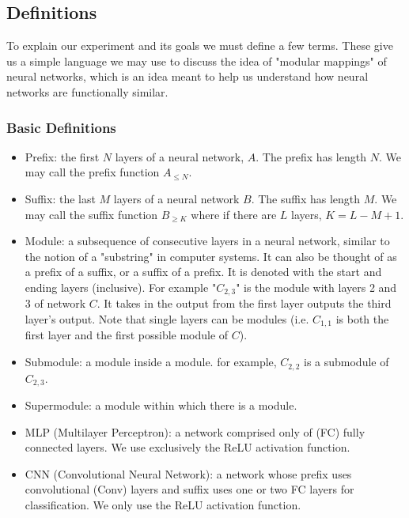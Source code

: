 \documentclass{article} %
\begin{document}
\subsection{Definitions}
To explain our experiment and its goals we must define a few terms. These give us a simple language we may
use to discuss the idea of "modular mappings" of neural networks, which is an idea meant to help us understand how
neural networks are functionally similar.

\subsubsection*{Basic Definitions}
\begin{itemize}
   \item Prefix: the first \(N\) layers of a neural network, \(A\). The prefix has length \(N\). We may call the prefix function \(A_{\leq N}\).
   \item Suffix: the last \(M\) layers of a neural network \(B\). The suffix has length \(M\). We may call the suffix function \(B_{\geq K}\) where if there are \(L\) layers, \(K=L-M+1\).
   \item Module: a subsequence of consecutive layers in a neural network, similar to the notion of a "substring" in computer systems. It can also be thought of as a prefix of a suffix, or a suffix of a prefix. It is denoted with the start and ending layers (inclusive). For example "\(C_{2,3}\)" is the module with layers 2 and 3 of network \(C\). It takes in the output from the first layer outputs the third layer's output. Note that single layers can be modules (i.e. \(C_{1,1}\) is both the first layer and the first possible module of \(C\)).
   \item Submodule: a module inside a module. for example, \(C_{2,2}\) is a submodule of \(C_{2,3}\).
   \item Supermodule: a module within which there is a module.
   \item MLP (Multilayer Perceptron): a network comprised only of (FC) fully connected layers. We use exclusively the ReLU activation function.
   \item CNN (Convolutional Neural Network): a network whose prefix uses convolutional (Conv) layers and suffix uses one or two FC layers for classification. We only use the ReLU activation function.
\end{itemize}
\end{document}

